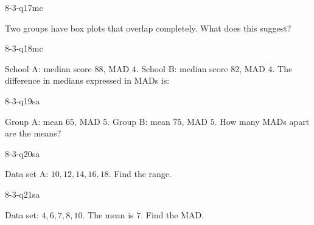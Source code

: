 \begin{practiceQuestion}{8-3-q17}{mc}
\begin{questionText}
Two groups have box plots that overlap completely. What does this suggest?
\end{questionText}
\end{practiceQuestion}

\begin{practiceQuestion}{8-3-q18}{mc}
\begin{questionText}
School A: median score $88$, MAD $4$. School B: median score $82$, MAD $4$. The difference in medians expressed in MADs is:
\end{questionText}
\end{practiceQuestion}


\begin{practiceQuestion}{8-3-q19}{sa}
\begin{questionText}
Group A: mean $65$, MAD $5$. Group B: mean $75$, MAD $5$. How many MADs apart are the means?
\end{questionText}
\end{practiceQuestion}

\begin{practiceQuestion}{8-3-q20}{sa}
\begin{questionText}
Data set A: $10, 12, 14, 16, 18$. Find the range.
\end{questionText}
\end{practiceQuestion}

\begin{practiceQuestion}{8-3-q21}{sa}
\begin{questionText}
Data set: $4, 6, 7, 8, 10$. The mean is $7$. Find the MAD.
\end{questionText}
\end{practiceQuestion}

